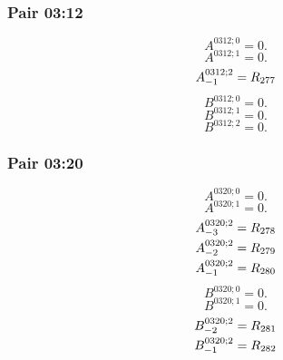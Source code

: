 \documentclass[11pt,a4paper]{article}
\begin{document}
\subsubsection{Pair 03:12}
\begin{equation}
A^{0312;0}=0.
\label{eq:cat-map-246}
\end{equation}
\begin{equation}
A^{0312;1}=0.
\label{eq:cat-map-247}
\end{equation}
\begin{equation}
\shortstack[l]{$\displaystyle A^{0312;2}_{-1}=R_{277}$}
\label{eq:cat-map-248}
\end{equation}
\begin{equation}
B^{0312;0}=0.
\label{eq:cat-map-249}
\end{equation}
\begin{equation}
B^{0312;1}=0.
\label{eq:cat-map-250}
\end{equation}
\begin{equation}
B^{0312;2}=0.
\label{eq:cat-map-251}
\end{equation}
\subsubsection{Pair 03:20}
\begin{equation}
A^{0320;0}=0.
\label{eq:cat-map-252}
\end{equation}
\begin{equation}
A^{0320;1}=0.
\label{eq:cat-map-253}
\end{equation}
\begin{equation}
\shortstack[l]{$\displaystyle A^{0320;2}_{-3}=R_{278}$\\
$\displaystyle A^{0320;2}_{-2}=R_{279}$\\
$\displaystyle A^{0320;2}_{-1}=R_{280}$}
\label{eq:cat-map-254}
\end{equation}
\begin{equation}
B^{0320;0}=0.
\label{eq:cat-map-255}
\end{equation}
\begin{equation}
B^{0320;1}=0.
\label{eq:cat-map-256}
\end{equation}
\begin{equation}
\shortstack[l]{$\displaystyle B^{0320;2}_{-2}=R_{281}$\\
$\displaystyle B^{0320;2}_{-1}=R_{282}$}
\label{eq:cat-map-257}
\end{equation}
\end{document}

